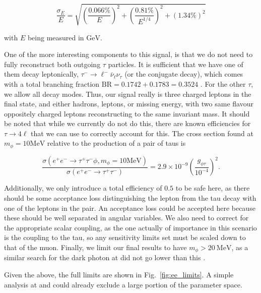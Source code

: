 \begin{equation}
    \frac{\sigma_E}{E} = \sqrt{\left(\frac{0.066\%}{E}\right)^2 + \left(\frac{0.81\%}{E^{1/4}}\right)^2 + \left(1.34\%\right)^2}
\end{equation}

\noindent with $E$ being measured in $\textrm{GeV}$.

One of the more interesting components to this signal, is that we do not need to fully reconstruct both outgoing $\tau$ particles.
It is sufficient that we have one of them decay leptonically, $\tau^- \rightarrow \ell^- \bar{\nu}_\ell \nu_\tau$ (or the conjugate decay), which comes with a total branching fraction $\textrm{BR} = 0.1742 + 0.1783 = 0.3524$ \cite{Agashe:2014kda}.
For the other $\tau$, we allow all decay modes.
Thus, our signal really is three charged leptons in the final state, and either hadrons, leptons, or missing energy, with two same flavour oppositely charged leptons reconstructing to the same invariant mass.
It should be noted that while we currently do not do this, there are known efficiencies for $\tau \rightarrow 4\ell$ that we can use to correctly account for this.
The cross section found at $m_\phi = 10\textrm{MeV}$ relative to the production of a pair of taus is

\begin{equation}
    \frac{\sigma\left(e^+ e^- \rightarrow \tau^+ \tau^- \phi, m_\phi = 10\textrm{MeV}\right)}{\sigma\left(e^+ e^- \rightarrow \tau^+ \tau^-\right)} = 2.9 \times 10^{-9} \left(\frac{g_{\phi\tau}}{10^{-4}}\right)^2\textrm{.}
\end{equation}

Additionally, we only introduce a total efficiency of $0.5$ to be safe here, as there should be some acceptance loss distinguishing the lepton from the tau decay with one of the leptons in the pair.
An acceptance loss could be accepted here because these should be well separated in angular variables.
We also need to correct for the appropriate scalar coupling, as the one actually of importance in this scenario is the coupling to the tau, so any sensitivity limits set must be scaled down to that of the muon.
Finally, we limit our final results to have $m_\phi > 20~\textrm{MeV}$, as a similar search for the dark photon at \babar did not go lower than this \cite{Lees:2014xha}.

Given the above, the full limits are shown in Fig.\ \ref{fig:ee_limits}.
A simple analysis at \babar and \belle could already exclude a large portion of the parameter space.

